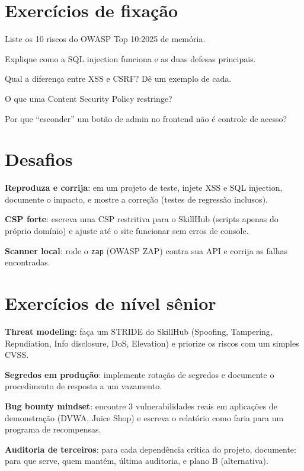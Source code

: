 \section{Exercícios de fixação}

\begin{exercicios}
  \item Liste os 10 riscos do OWASP Top 10:2025 de memória.
  \item Explique como a SQL injection funciona e as duas defesas principais.
  \item Qual a diferença entre XSS e CSRF? Dê um exemplo de cada.
  \item O que uma Content Security Policy restringe?
  \item Por que ``esconder'' um botão de admin no frontend não é controle de acesso?
\end{exercicios}

\section{Desafios}

\begin{desafios}
  \item \textbf{Reproduza e corrija}: em um projeto de teste, injete XSS e SQL injection, documente o impacto, e mostre a correção (testes de regressão inclusos).
  \item \textbf{CSP forte}: escreva uma CSP restritiva para o SkillHub (scripts apenas do próprio domínio) e ajuste até o site funcionar sem erros de console.
  \item \textbf{Scanner local}: rode o \texttt{zap} (OWASP ZAP) contra sua API e corrija as falhas encontradas.
\end{desafios}

\section{Exercícios de nível sênior}

\begin{seniores}
  \item \textbf{Threat modeling}: faça um STRIDE do SkillHub (Spoofing, Tampering, Repudiation, Info disclosure, DoS, Elevation) e priorize os riscos com um simples CVSS.
  \item \textbf{Segredos em produção}: implemente rotação de segredos e documente o procedimento de resposta a um vazamento.
  \item \textbf{Bug bounty mindset}: encontre 3 vulnerabilidades reais em aplicações de demonstração (DVWA, Juice Shop) e escreva o relatório como faria para um programa de recompensas.
  \item \textbf{Auditoria de terceiros}: para cada dependência crítica do projeto, documente: para que serve, quem mantém, última auditoria, e plano B (alternativa).
\end{seniores}


